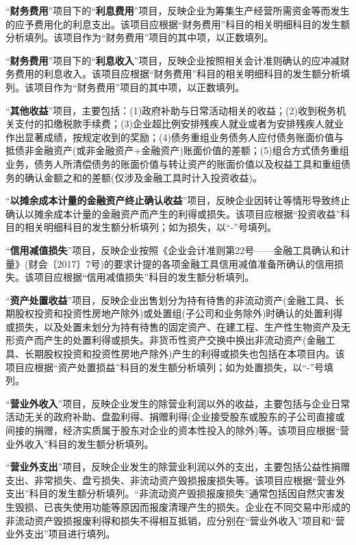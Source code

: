 \documentclass[UTF8,12pt]{ctexart}
\numberwithin{equation}{section} %
\numberwithin{figure}{section}
\numberwithin{table}{section}
\begin{document}
	“\textbf{财务费用}”项目下的“\textbf{利息费用}”项目，反映企业为筹集生产经营所需资金等而发生的应予费用化的利息支出。该项目应根据“财务费用”科目的相关明细科目的发生额分析填列。该项目作为“财务费用”项目的其中项，以正数填列。
	
	“\textbf{财务费用}”项目下的“\textbf{利息收入}”项目，反映企业按照相关会计准则确认的应冲减财务费用的利息收入。该项目应根据“财务费用”科目的相关明细科目的发生额分析填列。该项目作为“财务费用”项目的其中项，以正数填列。
	
	“\textbf{其他收益}”项目，主要包括：(1)政府补助与日常活动相关的收益；(2)收到税务机关支付的扣缴税款手续费；(3)企业超比例安排残疾人就业或者为安排残疾人就业作出显著成绩，按规定收到的奖励；(4)债务重组业务债务人应付债务账面价值与抵债非金融资产(或非金融资产+金融资产)账面价值的差额；(5)组合方式债务重组业务，债务人所清偿债务的账面价值与转让资产的账面价值以及权益工具和重组债务的确认金额之和的差额(仅涉及金融工具时计入投资收益)。
	
	“\textbf{以摊余成本计量的金融资产终止确认收益}”项目，反映企业因转让等情形导致终止确认以摊余成本计量的金融资产而产生的利得或损失。该项目应根据“投资收益”科目的相关明细科目的发生额分析填列；如为损失，以“-”号填列。
	
	“\textbf{信用减值损失}”项目，反映企业按照《企业会计准则第22号——金融工具确认和计量》(财会〔2017〕7号)的要求计提的各项金融工具信用减值准备所确认的信用损失。该项目应根据“信用减值损失”科目的发生额分析填列。
	
	“\textbf{资产处置收益}”项目，反映企业出售划分为持有待售的非流动资产(金融工具、长期股权投资和投资性房地产除外)或处置组(子公司和业务除外)时确认的处置利得或损失，以及处置未划分为持有待售的固定资产、在建工程、生产性生物资产及无形资产而产生的处置利得或损失。非货币性资产交换中换出非流动资产(金融工具、长期股权投资和投资性房地产除外)产生的利得或损失也包括在本项目内。该项目应根据“资产处置损益”科目的发生额分析填列；如为处置损失，以“-”号填列。
	
	“\textbf{营业外收入}”项目，反映企业发生的除营业利润以外的收益，主要包括与企业日常活动无关的政府补助、盘盈利得、捐赠利得(企业接受股东或股东的子公司直接或间接的捐赠，经济实质属于股东对企业的资本性投入的除外)等。该项目应根据“营业外收入”科目的发生额分析填列。
	
	“\textbf{营业外支出}”项目，反映企业发生的除营业利润以外的支出，主要包括公益性捐赠支出、非常损失、盘亏损失、非流动资产毁损报废损失等。该项目应根据“营业外支出”科目的发生额分析填列。“非流动资产毁损报废损失”通常包括因自然灾害发生毁损、已丧失使用功能等原因而报废清理产生的损失。企业在不同交易中形成的非流动资产毁损报废利得和损失不得相互抵销，应分别在“营业外收入”项目和“营业外支出”项目进行填列。
	
\end{document}
